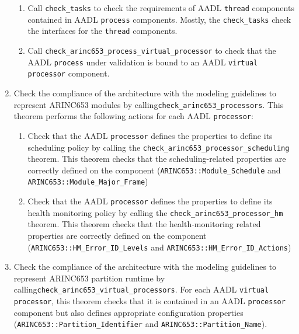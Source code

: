 \documentclass[times, 10pt]{article}
\begin{document}
\begin{enumerate}
\begin{enumerate}
            \item
                Call \texttt{check\_tasks} to check the requirements of AADL
                \texttt{thread} components contained in AADL \texttt{process}
                components. Mostly, the \texttt{check\_tasks} check the
                interfaces for the \texttt{thread} components.
            \item
                Call \texttt{check\_arinc653\_process\_virtual\_processor} to check
                that the AADL \texttt{process} under validation is bound
                to an AADL \texttt{virtual processor} component.
        \end{enumerate}
    \item
        Check the compliance of the architecture with
        the modeling guidelines to represent ARINC653 modules
        by calling\texttt{check\_arinc653\_processors}. This theorem
        performs the following actions for each AADL \texttt{processor}:
        \begin{enumerate}
            \item
                Check that the AADL \texttt{processor} defines
                the properties to define its scheduling policy
                by calling the \texttt{check\_arinc653\_processor\_scheduling}
                theorem. This theorem checks that the scheduling-related
                properties are correctly defined on the component
                (\texttt{ARINC653::Module\_Schedule} and \\ 
                \texttt{ARINC653::Module\_Major\_Frame})
            \item
                Check that the AADL \texttt{processor} defines
                the properties to define its health monitoring policy
                by calling the \texttt{check\_arinc653\_processor\_hm}
                theorem. This theorem checks that the health-monitoring related
                properties are correctly defined on the component
                (\texttt{ARINC653::HM\_Error\_ID\_Levels} and 
                \texttt{ARINC653::HM\_Error\_ID\_Actions})
        \end{enumerate}
    \item
        Check the compliance of the architecture with
        the modeling guidelines to represent ARINC653 partition runtime
        by calling\texttt{check\_arinc653\_virtual\_processors}.
        For each AADL \texttt{virtual processor}, this theorem checks
        that it is contained in an AADL \texttt{processor} component but also
        defines appropriate configuration properties
        (\texttt{ARINC653::Partition\_Identifier} and
        \texttt{ARINC653::Partition\_Name}).
\end{enumerate}
\end{document}
